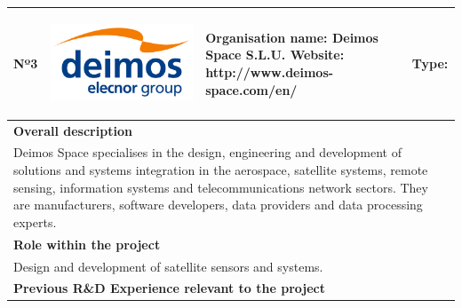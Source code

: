 \begin{longtable}[H]{|p{0.7cm}|p{4cm}|p{7cm}|p{1.3cm}|}
	\hline
	\begin{center} Nº3 \end{center} & \begin{center} \includegraphics[scale=0.05]{./logos/Blue-Logo_White-Background_EN} \end{center} & \begin{center} \textbf{Organisation name:} Deimos Space S.L.U. \newline \textbf{Website:} http://www.deimos-space.com/en/ \end{center} & \begin{center} Type: \end{center} \\ \hline
	
	\multicolumn{4}{|p{13cm}|}{\textbf{Overall description}}  \\ \hline
	
	\multicolumn{4}{|p{14.5cm}|}{Deimos Space specialises in the design, engineering and development of solutions and systems integration in the aerospace, satellite systems, remote sensing, information systems and telecommunications network sectors. They are manufacturers, software developers, data providers and data processing experts.}  \\ \hline
	
	\multicolumn{4}{|p{13cm}|}{\textbf{Role within the project}}   \\ \hline
	
	\multicolumn{4}{|p{14.5cm}|}{Design and development of satellite sensors and systems.}  \\ \hline
	
	\multicolumn{4}{|p{13cm}|}{\textbf{Previous R\&D Experience relevant to the project}}  \\ \hline
	

\end{longtable}
